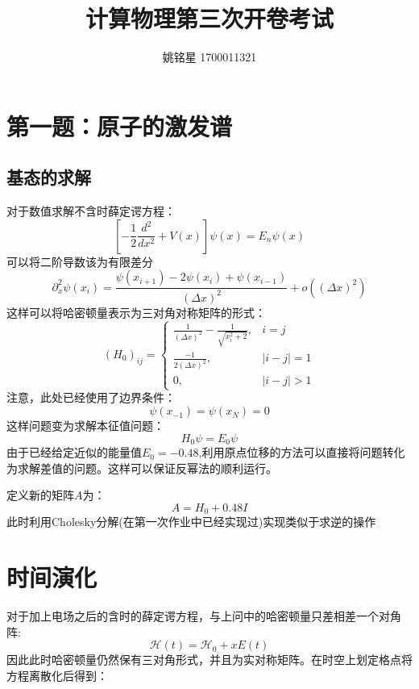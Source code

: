 \documentclass[a4paper]{ctexart}
\title{计算物理第三次开卷考试}
\author{姚铭星 1700011321}
\date{}
\begin{document}
\maketitle
\section{第一题：原子的激发谱}
\subsection{基态的求解}
对于数值求解不含时薛定谔方程：
\begin{equation}
\left[-\frac{1}{2} \frac{d^{2}}{d x^{2}}+V(x)\right] \psi(x)=E_{n} \psi(x)
\end{equation}
可以将二阶导数该为有限差分
\begin{equation}
\partial_{x}^{2} \psi\left(x_{i}\right)=\frac{\psi\left(x_{i+1}\right)-2 \psi\left(x_{i}\right)+\psi\left(x_{i-1}\right)}{(\Delta x)^{2}}+o\left((\Delta x)^{2}\right)
\end{equation}
这样可以将哈密顿量表示为三对角对称矩阵的形式：
\begin{equation}
\left(H_{0}\right)_{i j}=\left\{\begin{array}{ll}{\frac{1}{(\Delta x)^{2}}-\frac{1}{\sqrt{x_{i}^{2}+2}},} & {i=j} \\ {\frac{-1}{2(\Delta x)^{2}},} & {|i-j|=1} \\ {0,} & {|i-j|>1}\end{array}\right.
\end{equation}
注意，此处已经使用了边界条件：
\begin{equation}
\psi(x_{-1})=\psi(x_{N})=0
\end{equation}
这样问题变为求解本征值问题：
\begin{equation}
H_0\psi = E_0 \psi
\end{equation}
由于已经给定近似的能量值$E_0=-0.48$,利用原点位移的方法可以直接将问题转化为求解差值的问题。这样可以保证反幂法的顺利运行。

定义新的矩阵$A$为：
\begin{equation}
A = H_0 + 0.48I
\end{equation}
此时利用Cholesky分解(在第一次作业中已经实现过)实现类似于求逆的操作

\section{时间演化}
对于加上电场之后的含时的薛定谔方程，与上问中的哈密顿量只差相差一个对角阵:
\begin{equation}
\mathcal{H}(t)=\mathcal{H}_{0}+x E(t)
\end{equation}
因此此时哈密顿量仍然保有三对角形式，并且为实对称矩阵。在时空上划定格点将方程离散化后得到：
\end{document}
